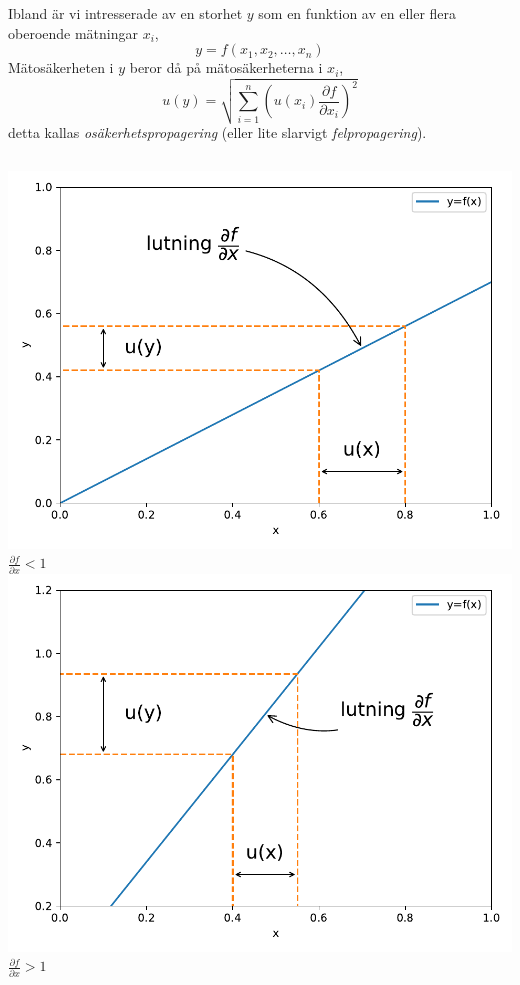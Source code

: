 \documentclass[9pt]{beamer}
\begin{document}
    \begin{frame}
        Ibland är vi intresserade av en storhet $y$ som en funktion av en eller flera oberoende mätningar $x_i$,
        \begin{equation*}
            y = f(x_1, x_2, \ldots, x_n)
        \end{equation*}
        Mätosäkerheten i $y$ beror då på mätosäkerheterna i $x_i$,
        \begin{equation*}
            u(y) = \sqrt{\sum_{i=1}^n\left(u(x_i)\frac{\partial f}{\partial x_i}\right)^2}
        \end{equation*}
        detta kallas \emph{osäkerhetspropagering} (eller lite slarvigt \emph{felpropagering}).
        \begin{columns}[T]
                \includegraphics[width=\textwidth]{errprop1.pdf}\\
                $\frac{\partial f}{\partial x} < 1$
                \includegraphics[width=\textwidth]{errprop2.pdf}\\
                $\frac{\partial f}{\partial x} > 1$
        \end{columns}
    \end{frame}
\end{document}
